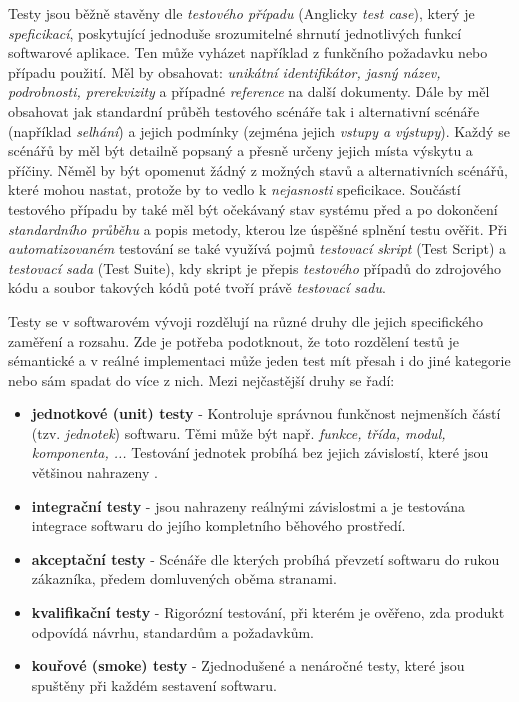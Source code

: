 \documentclass[czech, ma, kiv, he, iso690alph, pdf, viewonly]{fasthesis}
\begin{document}
    Testy jsou běžně stavěny dle \emph{testového případu} (Anglicky \textit{test case}), který je \emph{speficikací}, poskytující jednoduše srozumitelné shrnutí jednotlivých funkcí softwarové aplikace. Ten může vyházet například z funkčního požadavku nebo případu použití. Měl by obsahovat: \textit{unikátní identifikátor, jasný název, podrobnosti, prerekvizity} a případné \textit{reference} na další dokumenty. Dále by měl obsahovat jak standardní průběh testového scénáře tak i alternativní scénáře (například \textit{selhání}) a jejich podmínky (zejména jejich \textit{vstupy a výstupy}). Každý se scénářů by měl být detailně popsaný a přesně určeny jejich místa výskytu a příčiny. Něměl by být opomenut žádný z možných stavů a alternativních scénářů, které mohou nastat, protože by to vedlo k \emph{nejasnosti} speficikace. Součástí testového případu by také měl být očekávaný stav systému před a po dokončení \emph{standardního průběhu} a popis metody, kterou lze úspěšné splnění testu ověřit. \cite{brada2023usecase} Při \textit{automatizovaném} testování se také využívá pojmů \textit{testovací skript} (Test Script) a \textit{testovací sada} (Test Suite), kdy skript je přepis \textit{testového} případů do zdrojového kódu a soubor takových kódů poté tvoří právě \textit{testovací sadu}. \cite{brada2015crashcourse}

    Testy se v softwarovém vývoji rozdělují na různé druhy dle jejich specifického zaměření a rozsahu. Zde je potřeba podotknout, že toto rozdělení testů je sémantické a v reálné implementaci může jeden test mít přesah i do jiné kategorie nebo sám spadat do více z nich. Mezi nejčastější druhy se řadí:
    \begin{itemize}
        \item \textbf{jednotkové (unit) testy} - Kontroluje správnou funkčnost nejmenších částí (tzv. \textit{jednotek}) softwaru. Těmi může být např. \textit{funkce, třída, modul, komponenta, ...} Testování jednotek probíhá bez jejich závislostí, které jsou většinou nahrazeny .
        \item \textbf{integrační testy} -  jsou nahrazeny reálnými závislostmi a je testována integrace softwaru do jejího kompletního běhového prostředí. 
        \item \textbf{akceptační testy} - Scénáře dle kterých probíhá převzetí softwaru do rukou zákazníka, předem domluvených oběma stranami.
        \item \textbf{kvalifikační testy} - Rigorózní testování, při kterém je ověřeno, zda produkt odpovídá návrhu, standardům a požadavkům. 
        \item \textbf{kouřové (smoke) testy} - Zjednodušené a nenáročné testy, které jsou spuštěny při každém sestavení softwaru.
    \end{itemize}
 
\end{document}
